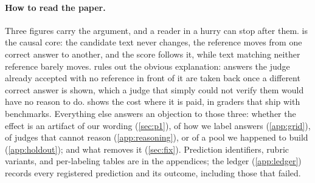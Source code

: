 \documentclass{article}
\begin{document}
\paragraph{How to read the paper.}
Three figures carry the argument, and a reader in a hurry can stop after them.
 is the causal core: the candidate text never changes, the reference moves from one correct answer to another, and the score follows it, while text matching neither reference barely moves.
 rules out the obvious explanation: answers the judge already accepted with no reference in front of it are taken back once a different correct answer is shown, which a judge that simply could not verify them would have no reason to do.
 shows the cost where it is paid, in graders that ship with benchmarks.
Everything else answers an objection to those three: whether the effect is an artifact of our wording (\cref{sec:p1}), of how we label answers (\cref{app:grid}), of judges that cannot reason (\cref{app:reasoning}), or of a pool we happened to build (\cref{app:holdout}); and what removes it (\cref{sec:fix}).
Prediction identifiers, rubric variants, and per-labeling tables are in the appendices; the ledger (\cref{app:ledger}) records every registered prediction and its outcome, including those that failed.
\end{document}
